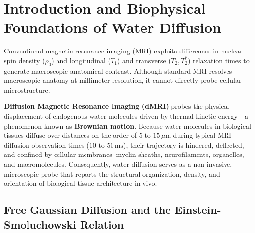 \documentclass[11pt,a4paper]{article}
\begin{document}
\tableofcontents
\newpage

\section{Introduction and Biophysical Foundations of Water Diffusion}

Conventional magnetic resonance imaging (MRI) exploits differences in nuclear spin density ($\rho_0$) and longitudinal ($T_1$) and transverse ($T_2, T_2^*$) relaxation times to generate macroscopic anatomical contrast. Although standard MRI resolves macroscopic anatomy at millimeter resolution, it cannot directly probe cellular microstructure.

\textbf{Diffusion Magnetic Resonance Imaging (dMRI)} probes the physical displacement of endogenous water molecules driven by thermal kinetic energy—a phenomenon known as \textbf{Brownian motion}. Because water molecules in biological tissues diffuse over distances on the order of $5\text{ to }15\,\mu\text{m}$ during typical MRI diffusion observation times ($10\text{ to }50\,\text{ms}$), their trajectory is hindered, deflected, and confined by cellular membranes, myelin sheaths, neurofilaments, organelles, and macromolecules. Consequently, water diffusion serves as a non-invasive, microscopic probe that reports the structural organization, density, and orientation of biological tissue architecture in vivo.

\subsection{Free Gaussian Diffusion and the Einstein-Smoluchowski Relation}
\end{document}

